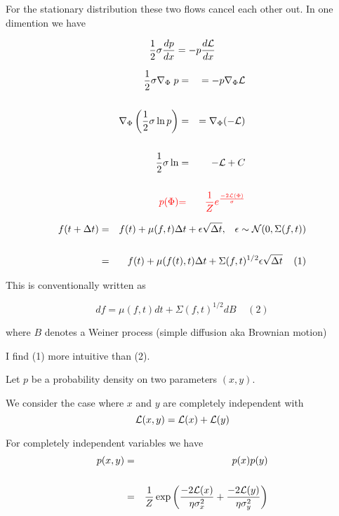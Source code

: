 {\vfill
For the stationary distribution these two flows cancel each other out.
In one dimention we have

\vfill
$$\frac{1}{2} \sigma \frac{dp}{dx} = - p\frac{d{\cal L}}{dx}$$



\vspace{-2ex}
\begin{eqnarray*}
\frac{1}{2} \sigma \nabla_\Phi\; {p} & = &  = - p\nabla_\Phi {\cal L} \\
\\
\nabla_\Phi \left(\frac{1}{2} \sigma \ln p\right) & = &  = \nabla_\Phi (- {\cal L}) \\
\\
\frac{1}{2} \sigma \ln & = & - {\cal L} + C \\
\\
{\color{red} p(\Phi)} & {\color{red} =} & {\color{red} \frac{1}{Z}e^{\frac{-2{\cal L}(\Phi)}{\sigma}}}
\end{eqnarray*}


\begin{eqnarray*}
f(t + \Delta t) &  =  & f(t) + \mu(f,t)\Delta t + \epsilon \sqrt{\Delta t},\;\;\;\epsilon \sim {\cal N}(0,\Sigma(f,t))\\
\\
 &  =  & f(t) + \mu(f(t),t)\Delta t + \Sigma(f,t)^{1/2} \epsilon \sqrt{\Delta t}\;\;\;\;(1)
 \end{eqnarray*}

\vfill
This is conventionally written as

$$d f = \mu(f,t)dt + \Sigma(f,t)^{1/2}dB\;\;\;\;(2)$$

\vfill
where $B$ denotes a Weiner process (simple diffusion aka Brownian motion)

\vfill
I find (1) more intuitive than (2).



Let $p$ be a probability density on two parameters $(x,y)$.

\vfill
We consider the case where $x$ and $y$ are completely independent with
$${\cal L}(x,y) = {\cal L}(x) + {\cal L}(y)$$

\vfill
For completely independent variables we have
\begin{eqnarray*}
p(x,y) & = & p(x)p(y) \\
\\
&= & \frac{1}{Z} \exp\left(\frac{-2{\cal L}(x)}{ \eta \sigma_x^2} + \frac{-2{\cal L}(y)}{\eta \sigma_y^2}\right)
\end{eqnarray*}

}
